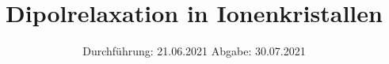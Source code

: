 

\subject{V48}
\title{Dipolrelaxation in Ionenkristallen}
\date{%
  Durchführung: 21.06.2021
  \hspace{3em}
  Abgabe: 30.07.2021
}



\maketitle
\thispagestyle{empty}
\tableofcontents
\newpage








\printbibliography{}


